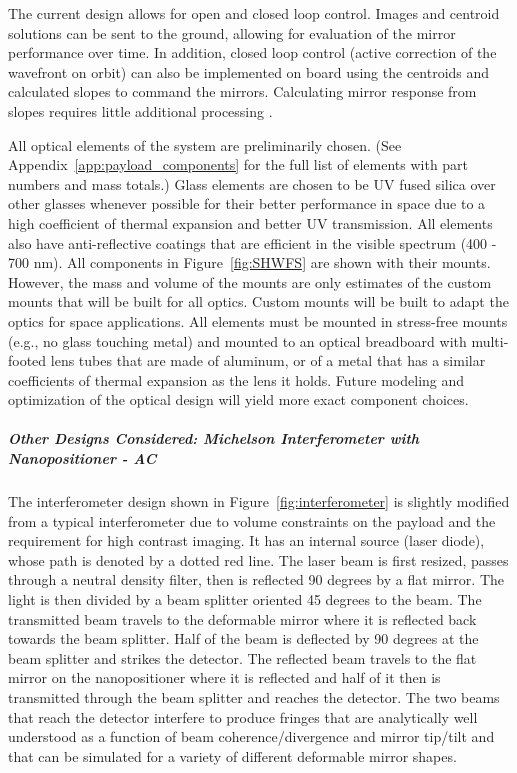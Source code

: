 \documentclass[12pt]{article}
\begin{document}
The current design allows for open and closed loop control.  Images and centroid solutions can be sent to the ground, allowing for evaluation of the mirror performance over time.  In addition, closed loop control (active correction of the wavefront on orbit) can also be implemented on board using the centroids and calculated slopes to command the mirrors.  Calculating mirror response from slopes requires little additional processing \cite{centroids}. 

All optical elements of the system are preliminarily chosen.
(See Appendix~\ref{app:payload_components} for the full list of
elements with part numbers and mass totals.)  Glass elements are
chosen to be UV fused silica over other glasses whenever possible for
their better performance in space \cite{radiation_optics} due to a
high coefficient of thermal expansion and better UV transmission.  All
elements also have anti-reflective coatings that are efficient in the
visible spectrum (400 - 700 nm).  All components in Figure~\ref{fig:SHWFS} are shown with their mounts.  However, the mass and volume of the mounts are only estimates of the custom mounts that will be built for all optics.  Custom mounts will be built to adapt the optics for space applications.  All elements must be mounted in stress-free mounts (e.g., no glass touching metal) and mounted to an optical breadboard with multi-footed lens tubes that are made of aluminum, or of a metal that has a similar coefficients of thermal expansion as the lens it holds.  Future modeling and optimization of the optical design will yield more exact component choices.

\subparagraph{Other Designs Considered: Michelson Interferometer with Nanopositioner - AC}\label{sec:payload_interferometer}
The interferometer design shown in Figure~\ref{fig:interferometer} is slightly modified from a typical interferometer due to volume constraints on the payload and the requirement for high contrast imaging. It has an internal source (laser diode), whose path is denoted by a dotted red line.
The laser beam is first resized, passes through a neutral density filter, then is reflected 90 degrees by a
flat mirror. The light is then divided by a beam splitter oriented 45
degrees to the beam. The transmitted beam travels to the deformable
mirror where it is reflected back towards the beam splitter. Half of
the beam is deflected by 90 degrees at the beam splitter and strikes
the detector. The reflected beam travels to the flat mirror on the
nanopositioner where it is reflected and half of it then is transmitted
through the beam splitter and reaches the detector. The two beams that
reach the detector interfere to produce fringes \cite{traeger} that are analytically well understood as a function of beam coherence/divergence and mirror tip/tilt \cite{demtroeder} and that can be simulated for a variety of different deformable mirror shapes.
\end{document}

